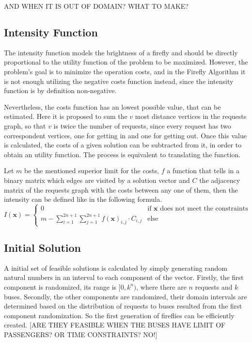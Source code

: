 \documentclass[tuberlin,cic,tc,openright,english,noabntcite,oneside]{iiufrgs}
\begin{document}
AND WHEN IT IS OUT OF DOMAIN? WHAT TO MAKE?

\subsection{Intensity Function}
The intensity function models the brightness of a firefly and should be directly proportional to the utility function of the problem to be maximized. However, the problem's goal is to minimize the operation costs, and in the Firefly Algorithm it is not enough utilizing the negative costs function instead, since the intensity function is by definition non-negative.

Nevertheless, the costs function has an lowest possible value, that can be estimated. Here it is proposed to sum the $v$ most distance vertices in the requests graph, so that $v$ is twice the number of requests, since every request has two correspondent vertices, one for getting in and one for getting out. Once this value is calculated, the costs of a given solution can be subtracted from it, in order to obtain an utility function. The process is equivalent to translating the function.

Let $m$ be the mentioned superior limit for the costs, $f$ a function that tells in a binary matrix which edges are visited by a solution vector and $C$ the adjacency matrix of the requests graph with the costs between any one of them, then the intensity can be defined like in the following formula.
$$I(\mathbf{x}) = \begin{cases} 0 & \text{if }\mathbf{x}\text{ does not meet the constraints}\\
								m - \displaystyle\sum_{i=1}^{2n+1}\sum_{j=1}^{2n+1} f(\mathbf{x})_{i,j} \cdot C_{i,j} & \text{else}
					\end{cases}$$

\subsection{Initial Solution}
A initial set of feasible solutions is calculated by simply generating random natural numbers in an interval to each component of the vector. Firstly, the first component is randomized, its range is $[0, k^n)$, where there are $n$ requests and $k$ buses. Secondly, the other components are randomized, their domain intervals are determined based on the distribution of requests to buses resulted from the first component randomization. So the first generation of fireflies can be efficiently created. [ARE THEY FEASIBLE WHEN THE BUSES HAVE LIMIT OF PASSENGERS? OR TIME CONSTRAINTS? NO!]
\end{document}
